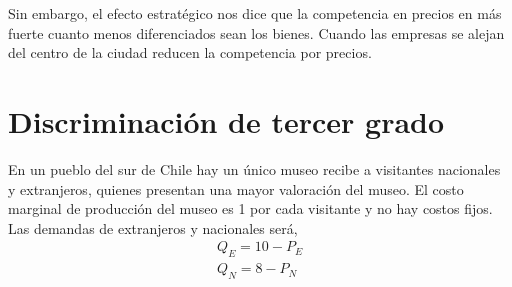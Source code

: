 \documentclass{exam}
\begin{document}
\begin{itemize}
\begin{solution}
        Sin embargo, el efecto estratégico nos dice que la competencia en precios en más fuerte cuanto menos diferenciados sean los bienes. Cuando las empresas se alejan del centro de la ciudad reducen la competencia por precios. 
    \end{solution}
\end{itemize}

\section{Discriminación de tercer grado}

En un pueblo del sur de Chile hay un único museo recibe a visitantes nacionales y extranjeros, quienes presentan una mayor valoración del museo. El costo marginal de producción del museo es 1 por cada visitante y no hay costos fijos. Las demandas de extranjeros y nacionales será,
\begin{align*}
    Q_E = 10-P_E \\
    Q_N = 8 - P_N
\end{align*}
\end{document}
